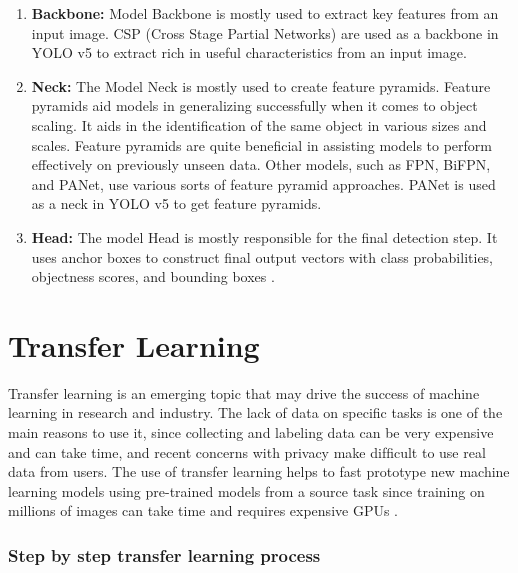\begin{enumerate}
    \item {\bf Backbone:} Model Backbone is mostly used to extract key features from an input 
        image. CSP (Cross Stage Partial Networks) are used as a backbone in YOLO v5 to
        extract rich in useful characteristics from an input image.
    \item {\bf Neck:} The Model Neck is mostly used to create feature pyramids. 
        Feature pyramids aid models in generalizing successfully when it comes to 
        object scaling. It aids in the identification of the same object in various 
        sizes and scales. Feature pyramids are quite beneficial in assisting models 
        to perform effectively on previously unseen data. Other models, such as FPN, 
        BiFPN, and PANet, use various sorts of feature pyramid approaches.
        PANet is used as a neck in YOLO v5 to get feature pyramids.
    \item {\bf Head:} The model Head is mostly responsible for the final detection step. 
        It uses anchor boxes to construct final output vectors with class probabilities, 
        objectness scores, and bounding boxes \cite{gar21}.
\end{enumerate}

\section{Transfer Learning}

Transfer learning is an emerging topic that may drive the success of 
machine learning in research and industry. The lack of data on specific 
tasks is one of the main reasons to use it, since collecting and labeling 
data can be very expensive and can take time, and recent concerns with 
privacy make difﬁcult to use real data from users. The use of transfer 
learning helps to fast prototype new machine learning models using pre-trained 
models from a source task since training on millions of images can take time 
and requires expensive GPUs \cite{rib19}.

\subsubsection{Step by step transfer learning process}

